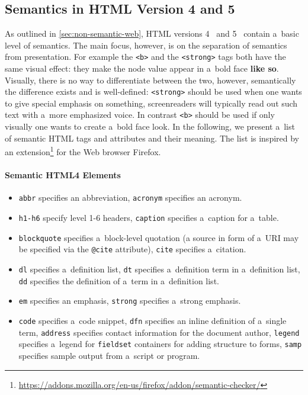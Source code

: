 \subsection{Semantics in HTML Version 4 and 5}
As outlined in \autoref{sec:non-semantic-web}, HTML versions 4~\cite{LeHors1999} and 5~\cite{Hickson2011}
contain a~basic level of semantics.
The main focus, however, is on the separation of semantics from presentation.
For example the \texttt{<b>} and the \texttt{<strong>} tags both have the same visual effect:
they make the node value appear in a~bold face \textbf{like so}.
Visually, there is no way to differentiate between the two, however,
semantically the difference exists and is well-defined:
\texttt{<strong>} should be used when one wants to give special emphasis on something,
screenreaders will typically read out such text with a~more emphasized voice.
In contrast \texttt{<b>} should be used if only visually one wants to create a~bold face look.
In the following, we present a~list of semantic HTML tags and attributes and their meaning.
The list is inspired by an
extension\footnote{\url{https://addons.mozilla.org/en-us/firefox/addon/semantic-checker/}}
for the Web browser Firefox.

\paragraph{Semantic HTML4 Elements}
\begin{itemize}
\item \texttt{abbr} specifies an abbreviation, \texttt{acronym} specifies an acronym.
\item \texttt{h1-h6} specify level 1-6 headers, \texttt{caption} specifies a~caption for a~table.
\item \texttt{blockquote} specifies a~block-level quotation
(a source in form of a~URI may be specified via the \texttt{@cite} attribute),
\texttt{cite} specifies a~citation.
\item \texttt{dl} specifies a~definition list, \texttt{dt} specifies a~definition term in a~definition list,
\texttt{dd} specifies the definition of a~term in a~definition list.
\item \texttt{em} specifies an emphasis, \texttt{strong} specifies a~strong emphasis.
\item \texttt{code} specifies a~code snippet, \texttt{dfn} specifies an inline definition of a~single term,
\texttt{address} specifies contact information for the document author,
\texttt{legend} specifies a~legend for \texttt{fieldset} containers for adding structure to forms,
\texttt{samp} specifies sample output from a~script or program.
\end{itemize}

